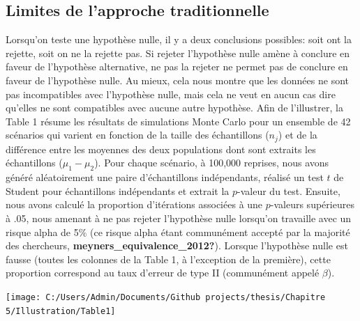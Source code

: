 \documentclass[
  english,
  man]{apa6}
\begin{document}
\hypertarget{limites-de-lapproche-traditionnelle}{%
\subsection{Limites de l'approche traditionnelle}\label{limites-de-lapproche-traditionnelle}}

Lorsqu'on teste une hypothèse nulle, il y a deux conclusions possibles: soit ont la rejette, soit on ne la rejette pas. Si rejeter l'hypothèse nulle amène à conclure en faveur de l'hypothèse alternative, ne pas la rejeter ne permet pas de conclure en faveur de l'hypothèse nulle. Au mieux, cela nous montre que les données ne sont pas incompatibles avec l'hypothèse nulle, mais cela ne veut en aucun cas dire qu'elles ne sont compatibles avec aucune autre hypothèse. Afin de l'illustrer, la Table 1 résume les résultats de simulations Monte Carlo pour un ensemble de 42 scénarios qui varient en fonction de la taille des échantillons (\(n_j\)) et de la différence entre les moyennes des deux populations dont sont extraits les échantillons (\(\mu_1-\mu_2\)). Pour chaque scénario, à 100,000 reprises, nous avons généré aléatoirement une paire d'échantillons indépendants, réalisé un test \(t\) de Student pour échantillons indépendants et extrait la \(p\)-valeur du test. Ensuite, nous avons calculé la proportion d'itérations associées à une \(p\)-valeurs supérieures à .05, nous amenant à ne pas rejeter l'hypothèse nulle lorsqu'on travaille avec un risque alpha de 5\% (ce risque alpha étant communément accepté par la majorité des chercheurs, \textbf{meyners\_equivalence\_2012?}). Lorsque l'hypothèse nulle est fausse (toutes les colonnes de la Table 1, à l'exception de la première), cette proportion correspond au taux d'erreur de type II (communément appelé \(\beta\)).

\begin{flushleft}\texttt{[image: C:/Users/Admin/Documents/Github projects/thesis/Chapitre 5/Illustration/Table1]} \end{flushleft}
\newpage
\end{document}
